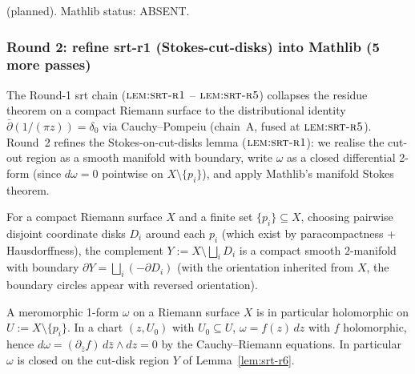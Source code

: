 \begin{lemma}
\label{lem:pgm-r10}
 (planned).  Mathlib status: ABSENT.
\leanok
\end{lemma}

\subsubsection*{Round 2: refine srt-r1 (Stokes-cut-disks) into Mathlib (5 more passes)}

The Round-1 srt chain ($\textsc{lem:srt-r1}$ -- $\textsc{lem:srt-r5}$)
collapses the residue theorem on a compact Riemann surface to the
distributional identity $\bar\partial(1/(\pi z)) = \delta_{0}$ via
Cauchy--Pompeiu (chain~A, fused at $\textsc{lem:srt-r5}$).  Round~2
refines the Stokes-on-cut-disks lemma ($\textsc{lem:srt-r1}$): we
realise the cut-out region as a smooth manifold with boundary, write
$\omega$ as a closed differential 2-form (since $d\omega = 0$ pointwise
on $X \setminus \{p_{i}\}$), and apply Mathlib's manifold Stokes
theorem.

\begin{lemma}
\label{lem:srt-r6}
For a compact Riemann surface $X$ and a finite set
$\{p_{i}\} \subseteq X$, choosing pairwise disjoint coordinate disks
$D_{i}$ around each $p_{i}$ (which exist by paracompactness +
Hausdorffness), the complement
$Y := X \setminus \bigsqcup_{i} D_{i}$ is a compact smooth
$2$-manifold with boundary $\partial Y = \bigsqcup_{i} (-\partial D_{i})$
(with the orientation inherited from $X$, the boundary circles
appear with reversed orientation).
\leanok
\end{lemma}

\begin{lemma}
\label{lem:srt-r7}
A meromorphic 1-form $\omega$ on a Riemann surface $X$ is in
particular holomorphic on $U := X \setminus \{p_{i}\}$.  In a chart
$(z, U_{0})$ with $U_{0} \subseteq U$, $\omega = f(z)\,dz$ with $f$
holomorphic, hence $d\omega = (\partial_{\bar z} f)\,d\bar z \wedge dz
= 0$ by the Cauchy--Riemann equations.  In particular $\omega$ is
closed on the cut-disk region $Y$ of Lemma~\ref{lem:srt-r6}.
\leanok
\end{lemma}


